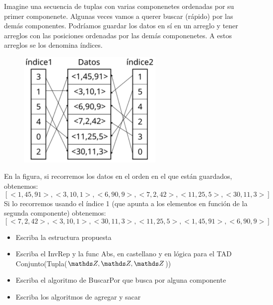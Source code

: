 Imagine una secuencia de tuplas con varias componenetes ordenadas por su primer componenete. Algunas veces vamos a querer buscar (rápido) por las demás componentes. Podríamos guardar los datos en sí en un arreglo y tener arreglos con las posiciones ordenadas por las demás componenetes. A estos arreglos se los denomina índices.

\begin{figure}[h!]
	\includegraphics[width=7cm]{./indices.png}
\end{figure}

En la figura, si recorremos los datos en el orden en el que están guardados, obtenemos:
\[[<1,45,91>,<3,10,1>,<6,90,9>,<7,2,42>,<11,25,5>,<30,11,3>]\]
Si lo recorremos usando el índice 1 (que apunta a los elementos en función de la segunda componente) obtenemos:
\[[<7,2,42>,<3,10,1>,<30,11,3>,<11,25,5>,<1,45,91>,<6,90,9>]\]

\begin{itemize}
	\item Escriba la estructura propuesta
	\item Escriba el InvRep y la func Abs, en castellano y en lógica para el TAD Conjunto(Tupla($\ent,\ent,\ent$))
	\item Escriba el algoritmo de BuscarPor que busca por alguna componente
	\item Escriba los algoritmos de agregar y sacar
\end{itemize}

